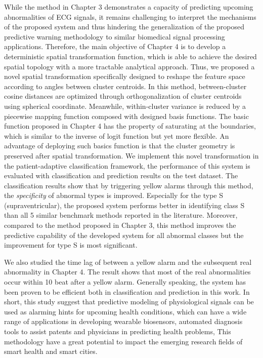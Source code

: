 While the method in Chapter 3 demonstrates a capacity of predicting upcoming abnormalities of ECG signals, it remains challenging to interpret the mechanisms of the proposed system and thus hindering the generalization of the proposed predictive warning methodology to similar  biomedical signal processing applications. Therefore, the main objective of Chapter 4 is to develop a deterministic spatial transformation function, which is able to achieve the desired spatial topology with a more tractable analytical approach. Thus, we proposed a novel spatial transformation specifically designed to reshape the feature space according to angles between cluster centroids. In this method, between-cluster cosine distances are optimized through orthogonalization of cluster centroids using spherical coordinate. Meanwhile, within-cluster variance is reduced by a piecewise mapping function composed with designed basis functions. The basic function proposed in Chapter 4 has the property of saturating at the boundaries, which is similar to the inverse of logit function but yet more flexible. An advantage of deploying such basics function is that the cluster geometry is preserved after spatial transformation. 
We implement this novel transformation in the patient-adaptive classification framework, the performance of this system is evaluated with classification and prediction results on the test dataset. The classification results show that by triggering yellow alarms through this method, the \textit{specificity} of abnormal types is improved. Especially for the type S (supraventricular), the proposed system performs better in identifying class S than all 5 similar benchmark methods reported in the literature.
Moreover, compared to the method proposed in Chapter 3, this method improves the predictive capability of the developed system for all abnormal classes but the improvement for type S is most significant. 

We also studied the time lag of between a yellow alarm and the subsequent real abnormality in Chapter 4. The result shows that most of the real abnormalities occur within 10 beat after a yellow alarm. Generally speaking, the system has been proven to be efficient both in classification and prediction in this work. In short, this study suggest that predictive modeling of physiological signals can be used as alarming hints for upcoming health conditions, which can have a wide range of applications in developing wearable biosensors,  automated diagnosis tools to assist patents and physicians in predicting health problems, This methodology have a great potential to impact the emerging research fields of smart health and smart cities.  


